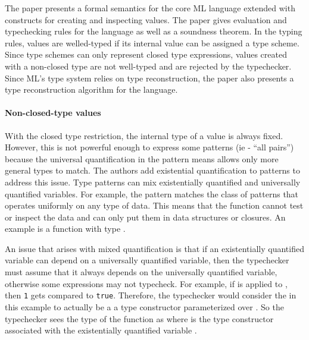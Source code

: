 \documentclass[12pt]{article}	%
\begin{document}
The paper presents a formal semantics for the core ML language extended with constructs for creating and inspecting \Dynamic values. The paper gives evaluation and typechecking rules for the language as well as a soundness theorem. In the typing rules, \Dynamic values are welled-typed if its internal value can be assigned a type scheme. Since type schemes can only represent closed type expressions, \Dynamic values created with a non-closed type are not well-typed and are rejected by the typechecker. Since ML's type system relies on type reconstruction, the paper also presents a type reconstruction algorithm for the language.

\paragraph{Non-closed-type \Dynamic values}
With the closed type restriction, the internal type of a \Dynamic value is always fixed. However, this is not powerful enough to express some patterns (ie - ``all pairs'') because the universal quantification in the pattern means allows only more general types to match. The authors add existential quantification to patterns to address this issue. Type patterns can mix existentially quantified and universally quantified variables. For example, the pattern  matches the class of patterns that operates uniformly on any type of data. This means that the function cannot test or inspect the data and can only put them in data structures or closures. An example is a function with type .

An issue that arises with mixed quantification is that if an existentially quantified variable can depend on a universally quantified variable, then the typechecker must assume that it always depends on the universally quantified variable, otherwise some expressions may not typecheck. For example, if  is applied to , then \texttt{1} gets compared to \texttt{true}. Therefore, the typechecker would consider the \mlcode{\beta} in this example to actually be a a type constructor parameterized over . So the typechecker sees the type of the function as  where  is the type constructor associated with the existentially quantified variable \mlcode{\beta}.
\end{document}

